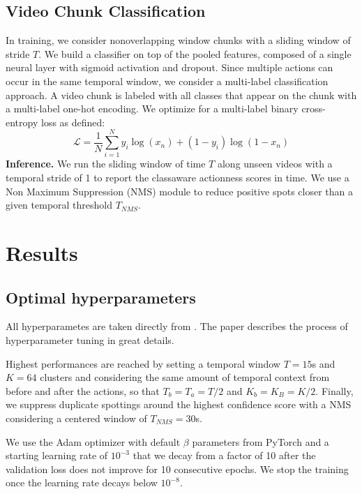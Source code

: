 \documentclass{article}
\begin{document}
\subsection{Video Chunk Classification}
In training, we consider nonoverlapping window chunks with a sliding window of stride $T$. We build a classifier on top of the pooled features, composed of a single neural layer with sigmoid activation and dropout. Since multiple actions can occur in the same temporal window, we consider a multi-label classification approach. A video chunk is labeled with all classes that appear
on the chunk with a multi-label one-hot encoding. We optimize for a multi-label binary cross-entropy loss as defined:
\begin{equation}
    \mathcal{L} = \frac{1}{N} \sum_{i=1}^Ny_i\log(x_n)+(1-y_i)\log(1-x_n)
\end{equation}
\textbf{Inference.} We run the sliding window of time $T$ along unseen videos with a temporal stride of 1 to report the classaware actionness scores in time. We use a Non Maximum Suppression (NMS) module to reduce positive spots closer than a given temporal threshold $T_{NMS}$.

\section{Results}
\subsection{Optimal hyperparameters}
All hyperparametes are taken directly from \cite{nv++}. The paper describes the process of hyperparameter tuning in great details. 

Highest performances are reached by setting a temporal window $T = 15$s and $K = 64$ clusters
and considering the same amount of temporal context from before and after the actions, so that $T_b = T_a = T/2$ and $K_b = K_B =K/2$. Finally, we suppress duplicate spottings around the highest confidence score with a NMS considering a centered window of $T_{NMS} = 30$s.

We use the Adam optimizer with default $\beta$ parameters from PyTorch and a starting learning rate of $10^{-3}$ that we decay from a factor of 10 after the validation loss does not improve for 10 consecutive epochs. We stop the training once the learning rate decays below $10^{-8}$.
\end{document}
